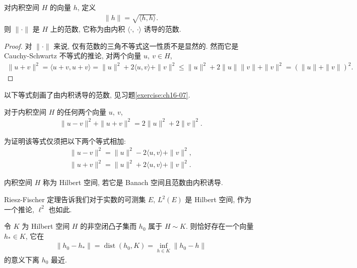 \documentclass[../../main.tex]{subfiles}
\begin{document}
\begin{proposition}\label{proposition:ch16-norm}
对内积空间 $H$ 的向量 $h$, 定义
\begin{align*}
\|h\|=\sqrt{\langle h,h\rangle}.
\end{align*}
则 $\|\cdot\|$ 是 $H$ 上的范数, 它称为由内积 $\langle\cdot,\ \cdot\rangle$ 诱导的范数.
\end{proposition}

\begin{proof}
对 $\|\cdot\|$ 来说, 仅有范数的三角不等式这一性质不是显然的. 然而它是 Cauchy-Schwartz 不等式的推论, 对两个向量 $u,\ v\in H$,
\begin{align*}
\|u+v\|^{2}=\langle u+v,u+v\rangle=\|u\|^{2}+2\langle u,v\rangle+\|v\|^{2}\leqslant\|u\|^{2}+2\|u\|\|v\|+\|v\|^{2}=(\|u\|+\|v\|)^{2}.
\end{align*}
\end{proof}

以下等式刻画了由内积诱导的范数, 见习题\cref{exercise:ch16-07}.

\begin{theorem}[平行四边形等式]\label{theorem:ch16-parallelogram}
对于内积空间 $H$ 的任何两个向量 $u,\ v$,
\begin{align*}
\|u-v\|^{2}+\|u+v\|^{2}=2\|u\|^{2}+2\|v\|^{2}.
\end{align*}
\end{theorem}

为证明该等式仅须把以下两个等式相加:
\begin{align*}
\|u-v\|^{2}=\|u\|^{2}-2\langle u,v\rangle+\|v\|^{2},\\
\|u+v\|^{2}=\|u\|^{2}+2\langle u,v\rangle+\|v\|^{2}.
\end{align*}

\begin{definition}[Hilbert 空间]\label{definition:ch16-hilbert}
内积空间 $H$ 称为 Hilbert 空间, 若它是 Banach 空间且范数由内积诱导.
\end{definition}

Riesz-Fischer 定理告诉我们对于实数的可测集 $E$, $L^{2}(E)$ 是 Hilbert 空间, 作为一个推论, $\ell^{2}$ 也如此.

\begin{proposition}\label{proposition:ch16-nearest-point}
令 $K$ 为 Hilbert 空间 $H$ 的非空闭凸子集而 $h_{0}$ 属于 $H\sim K$. 则恰好存在一个向量 $h_{*}\in K$, 它在
\begin{align*}
\|h_{0}-h_{*}\|=\operatorname{dist}(h_{0},K)=\inf_{h\in K}\|h_{0}-h\|
\end{align*}
的意义下离 $h_{0}$ 最近.
\end{proposition}
\end{document}

